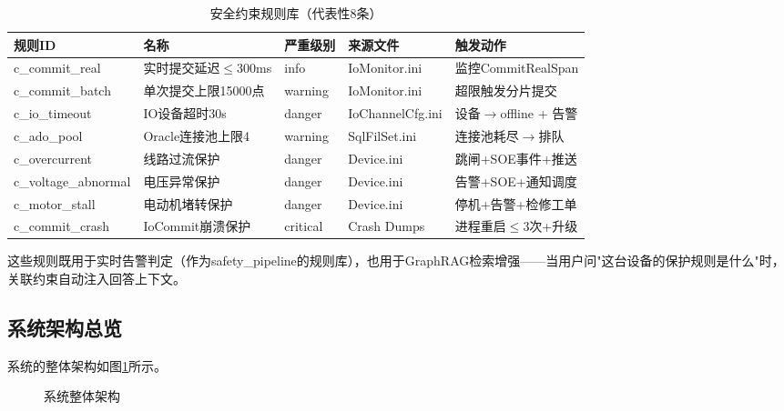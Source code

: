 \documentclass[12pt,a4paper]{article}
\begin{document}
\begin{table}[H]
\centering
\caption{安全约束规则库（代表性8条）}
\label{tab:constraints}
\begin{tabular}{@{}lllll@{}}
\toprule
\textbf{规则ID} & \textbf{名称} & \textbf{严重级别} & \textbf{来源文件} & \textbf{触发动作} \\
\midrule
c\_commit\_real & 实时提交延迟$\le$300ms & info & IoMonitor.ini & 监控CommitRealSpan \\
c\_commit\_batch & 单次提交上限15000点 & warning & IoMonitor.ini & 超限触发分片提交 \\
c\_io\_timeout & IO设备超时30s & danger & IoChannelCfg.ini & 设备$\to$offline + 告警 \\
c\_ado\_pool & Oracle连接池上限4 & warning & SqlFilSet.ini & 连接池耗尽$\to$排队 \\
c\_overcurrent & 线路过流保护 & danger & Device.ini & 跳闸+SOE事件+推送 \\
c\_voltage\_abnormal & 电压异常保护 & danger & Device.ini & 告警+SOE+通知调度 \\
c\_motor\_stall & 电动机堵转保护 & danger & Device.ini & 停机+告警+检修工单 \\
c\_commit\_crash & IoCommit崩溃保护 & critical & Crash Dumps & 进程重启$\le$3次+升级 \\
\bottomrule
\end{tabular}
\end{table}

这些规则既用于实时告警判定（作为safety\_pipeline的规则库），也用于GraphRAG检索增强——当用户问"这台设备的保护规则是什么"时，关联约束自动注入回答上下文。

\subsection{系统架构总览}

系统的整体架构如图\ref{fig:architecture}所示。

\begin{figure}[H]
\centering
\caption{系统整体架构}
\label{fig:architecture}
\end{figure}
\end{document}
